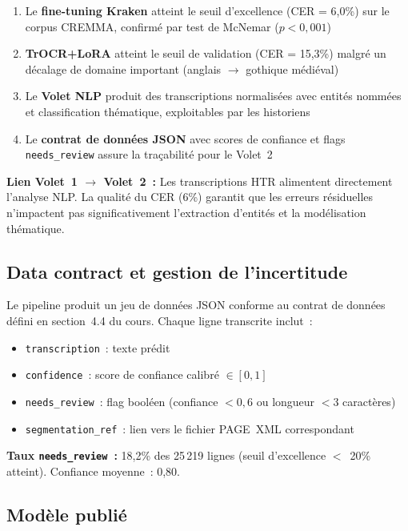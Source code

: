 \documentclass[11pt,a4paper]{article}
\begin{document}
\begin{enumerate}[leftmargin=*, itemsep=2pt]
\item Le \textbf{fine-tuning Kraken} atteint le seuil d'excellence (CER = 6,0\%) sur le corpus CREMMA, confirmé par test de McNemar ($p < 0,001$)
\item \textbf{TrOCR+LoRA} atteint le seuil de validation (CER = 15,3\%) malgré un décalage de domaine important (anglais $\rightarrow$ gothique médiéval)
\item Le \textbf{Volet NLP} produit des transcriptions normalisées avec entités nommées et classification thématique, exploitables par les historiens
\item Le \textbf{contrat de données JSON} avec scores de confiance et flags \texttt{needs\_review} assure la traçabilité pour le Volet~2
\end{enumerate}

\textbf{Lien Volet~1 $\rightarrow$ Volet~2~:} Les transcriptions HTR alimentent directement l'analyse NLP. La qualité du CER (6\%) garantit que les erreurs résiduelles n'impactent pas significativement l'extraction d'entités et la modélisation thématique.

\subsection{Data contract et gestion de l'incertitude}

Le pipeline produit un jeu de données JSON conforme au contrat de données défini en section~4.4 du cours. Chaque ligne transcrite inclut~:
\begin{itemize}[leftmargin=*, itemsep=1pt]
\item \texttt{transcription}~: texte prédit
\item \texttt{confidence}~: score de confiance calibré $\in [0,1]$
\item \texttt{needs\_review}~: flag booléen (confiance $< 0,6$ ou longueur $< 3$ caractères)
\item \texttt{segmentation\_ref}~: lien vers le fichier PAGE~XML correspondant
\end{itemize}

\noindent\textbf{Taux \texttt{needs\_review}~:} 18,2\% des 25\,219 lignes (seuil d'excellence $<$~20\% atteint). Confiance moyenne~: 0,80.

\subsection{Modèle publié}
\end{document}
